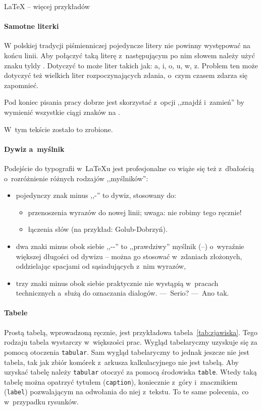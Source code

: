 \begin{easyappendix}{\LaTeX{} -- więcej przykładów}
\paragraph{Samotne literki}

W polskiej tradycji piśmienniczej pojedyncze litery nie powinny występować na końcu linii. Aby połączyć taką literę z~następującym po nim słowem należy użyć znaku tyldy \keys{\textasciitilde{}}. Dotyczyć to może liter takich jak: a, i, o, u, w, z. Problem ten może dotyczyć też wielkich liter rozpoczynających zdania, o~czym czasem zdarza się zapomnieć.

Pod koniec pisania pracy dobrze jest skorzystać z~opcji ,,znajdź i~zamień'' by wymienić wszystkie ciągi znaków  na .

W~tym tekście zostało to zrobione.

\paragraph{Dywiz a~myślnik}
Podejście do typografii w~\LaTeX{u} jest profesjonalne co wiąże się też z~dbałością o~rozróżnienie różnych rodzajów ,,myślników'':
\begin{itemize}
	\item pojedynczy znak minus ,,-'' to dywiz, stosowany do:
	\begin{itemize}
		\item przenoszenia wyrazów do nowej linii; uwaga: nie robimy tego ręcznie!
		\item łączenia słów (na przykład: Golub-Dobrzyń).
	\end{itemize}
	\item dwa znaki minus obok siebie ,,-{}-'' %
	to ,,prawdziwy'' myślnik (--) o~wyraźnie większej długości od dywizu -- można go stosować w~zdaniach złożonych, oddzielając spacjami od sąsiadujących z~nim wyrazów,
	\item trzy znaki minus obok siebie praktycznie nie wystąpią w~pracach technicznych a~służą do oznaczania dialogów. ---~Serio? ---~Ano tak.
\end{itemize}

\paragraph{Tabele}
Prostą tabelą, wprowadzoną ręcznie, jest przykładowa tabela~\ref{tab:zjawiska}. Tego rodzaju tabela wystarczy w~większości prac. Wygląd tabelaryczny uzyskuje się za pomocą otoczenia \texttt{tabular}. Sam wygląd tabelaryczny to jednak jeszcze nie jest tabela, tak jak zbiór komórek z~arkusza kalkulacyjnego nie jest tabelą. Aby uzyskać tabelę należy \texttt{tabular} otoczyć za pomocą środowiska \texttt{table}. Wtedy taką tabelę można opatrzyć tytułem (\texttt{caption}), koniecznie z~góry i~znacznikiem (\texttt{label}) pozwalającym na odwołania do niej z~tekstu. To te same polecenia, co w~przypadku rysunków.


\end{easyappendix}

